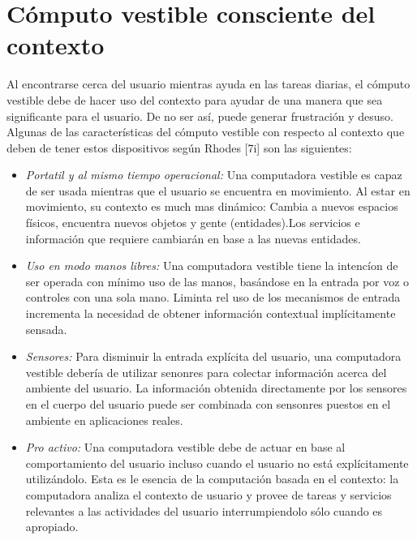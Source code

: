 \documentclass[letterpaper,12pt]{cicese}
\begin{document}
			\section{C\'omputo vestible consciente del contexto}
				Al encontrarse cerca del usuario mientras ayuda en las tareas diarias, el c\'omputo vestible debe de hacer uso del contexto para ayudar de una manera
				que sea significante para el usuario. De no ser as\'i, puede generar frustraci\'on y desuso. Algunas de las caracter\'isticas del c\'omputo vestible
				con respecto al contexto que deben de tener estos dispositivos seg\'un Rhodes [7i] son las siguientes:
				\begin{itemize}
					\item{\emph{Portatil y al mismo tiempo operacional:}} Una computadora vestible es capaz de ser usada mientras que el usuario se encuentra
					en movimiento. Al estar en movimiento, su contexto es much mas din\'amico: Cambia a nuevos espacios f\'isicos, encuentra nuevos objetos 
					y gente (entidades).Los servicios e informaci\'on que requiere cambiar\'an en base a las nuevas entidades.
				\end{itemize}
				\begin{itemize}
					\item{\emph{Uso en modo manos libres:}} Una computadora vestible tiene la intenc\'ion de ser operada con m\'inimo uso de las manos,
					bas\'andose en la entrada por voz o controles con una sola mano. Liminta rel uso de los mecanismos de entrada incrementa la necesidad
					de obtener informaci\'on contextual impl\'icitamente sensada.
				\end{itemize}
				\begin{itemize}
					\item{\emph{Sensores:}} Para disminuir la entrada expl\'icita del usuario, una computadora vestible deber\'ia de utilizar senonres para
					colectar informaci\'on acerca del ambiente del usuario. La informaci\'on obtenida directamente por los sensores en el cuerpo del
					usuario puede ser combinada con sensonres puestos en el ambiente en aplicaciones reales.
				\end{itemize}
				\begin{itemize}
					\item{\emph{Pro activo:}} Una computadora vestible debe de actuar en base al comportamiento del usuario incluso cuando el usuario no
					est\'a expl\'icitamente utiliz\'andolo. Esta es le esencia de la computaci\'on basada en el contexto: la computadora analiza el
					contexto de usuario y provee de tareas y servicios relevantes a las actividades del usuario interrumpiendolo s\'olo cuando es apropiado.
				\end{itemize}
\end{document}
